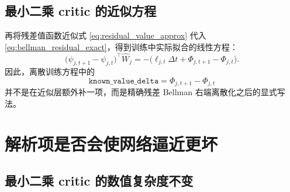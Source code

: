 \documentclass[11pt,a4paper]{article}
\begin{document}
\subsection{最小二乘 critic 的近似方程}

再将残差值函数近似式 \eqref{eq:residual_value_approx} 代入 \eqref{eq:bellman_residual_exact}，得到训练中实际拟合的线性方程：
\begin{equation}
\big(\psi_{j,t+1}-\psi_{j,t}\big)^\top \hat W_j
=
-\Big(
\ell_{j,t}\Delta t+\Phi_{j,t+1}-\Phi_{j,t}
\Big).
\label{eq:bellman_ls}
\end{equation}
因此，离散训练方程中的
\begin{equation}
\texttt{known\_value\_delta}=\Phi_{j,t+1}-\Phi_{j,t}
\end{equation}
并不是在近似层额外补一项，而是精确残差 Bellman 右端离散化之后的显式写法。

\section{解析项是否会使网络逼近更坏}

\subsection{最小二乘 critic 的数值复杂度不变}
\end{document}
